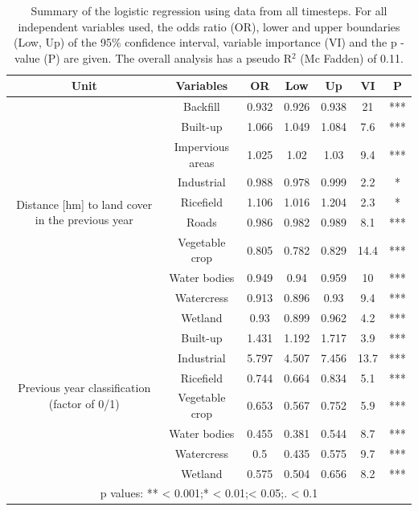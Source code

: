 \documentclass[11pt, A4, oneside]{report}
\begin{document}
\begin{table}[H]
\caption{Summary of the logistic regression using data from all timesteps. For all independent variables used, the odds ratio (OR), lower and upper boundaries (Low, Up) of the 95\% confidence interval, variable importance (VI) and the p - value (P) are given. The overall analysis has a pseudo R$^2$ (Mc Fadden) of 0.11.}
\centering
\begin{tabular}{c c c c c c c}
  \hline
 Unit & Variables & OR & Low & Up & VI & P \\ 
  \hline
 \multirow{10}{3cm}{Distance [hm] to land cover in the previous year} 
& Backfill & 0.932 & 0.926 & 0.938 & 21 & *** \\ 
  & Built-up & 1.066 & 1.049 & 1.084 & 7.6 & *** \\ 
  & Impervious areas & 1.025 & 1.02 & 1.03 & 9.4 & *** \\ 
  & Industrial & 0.988 & 0.978 & 0.999 & 2.2 & * \\ 
  & Ricefield & 1.106 & 1.016 & 1.204 & 2.3 & * \\ 
  & Roads & 0.986 & 0.982 & 0.989 & 8.1 & *** \\ 
  & Vegetable crop & 0.805 & 0.782 & 0.829 & 14.4 & *** \\ 
  & Water bodies & 0.949 & 0.94 & 0.959 & 10 & *** \\ 
  & Watercress & 0.913 & 0.896 & 0.93 & 9.4 & *** \\ 
  & Wetland & 0.93 & 0.899 & 0.962 & 4.2 & *** \\
                    \hline
\multirow{6}{3cm}{Previous year classification (factor of 0/1)} 
  & Built-up & 1.431 & 1.192 & 1.717 & 3.9 & *** \\ 
  & Industrial & 5.797 & 4.507 & 7.456 & 13.7 & *** \\ 
  & Ricefield & 0.744 & 0.664 & 0.834 & 5.1 & *** \\ 
  & Vegetable crop & 0.653 & 0.567 & 0.752 & 5.9 & *** \\ 
  & Water bodies & 0.455 & 0.381 & 0.544 & 8.7 & *** \\ 
  & Watercress & 0.5 & 0.435 & 0.575 & 9.7 & *** \\ 
  & Wetland & 0.575 & 0.504 & 0.656 & 8.2 & *** \\ 
   \hline
   \multicolumn{7}{c}{p values: \qquad *** < 0.001;\quad ** < 0.01;\quad * < 0.05;\quad . < 0.1 }\\
   \hline
\end{tabular}

\label{tab:logreg_allyrs}
\end{table}
\end{document}
